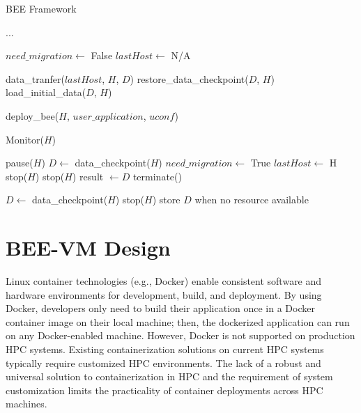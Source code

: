 \begin{algorithm}
\caption{BEE Framework}
\label{bee}
\begin{algorithmic}[1]

{...}


\STATE $need\_migration \leftarrow$ False
\STATE $lastHost \leftarrow$ N/A

		\STATE data\_tranfer($lastHost$, $H$, $D$)
		\STATE restore\_data\_checkpoint($D$, $H$) 
	\ELSE
		\STATE load\_initial\_data($D$, $H$) 
	\ENDIF
	
	
	\STATE deploy\_bee($H$, $user\_application$, $uconf$)

		\STATE Monitor($H$)
	\ENDWHILE

    	\STATE pause($H$)
		\STATE $D \leftarrow$ data\_checkpoint($H$) 
		\STATE $need\_migration \leftarrow$ True
		\STATE $lastHost \leftarrow$ H
		\STATE stop($H$)
	\ELSE
		\STATE stop($H$)
		\STATE result $\leftarrow D $
		\STATE terminate() 
	\ENDIF
\ENDWHILE

		\STATE $D\leftarrow$ data\_checkpoint($H$)
		\STATE stop($H$)
		\STATE store $D$ when no resource available
\ENDIF

\end{algorithmic}
\end{algorithm}


\section{BEE-VM Design}
Linux container technologies (e.g., Docker) enable consistent software and hardware environments for development, build, and deployment. By using Docker, developers only need to build their application once in a Docker container image on their local machine; then, the dockerized application can run on any Docker-enabled machine. However, Docker is not supported on production HPC systems. Existing containerization solutions on current HPC systems typically require customized HPC environments. The lack of a robust and universal solution to containerization in HPC and the requirement of system customization limits the practicality of container deployments across HPC machines.
  
